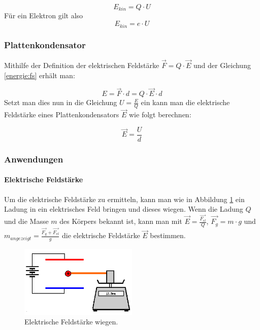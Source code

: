 \documentclass[a4paper]{article}
\begin{document}
				\begin{equation}
					E_{kin} = Q\cdot U
				\end{equation}
				Für ein Elektron gilt also
				\begin{equation}\label{elektrisches_feld:beschleunigung_elektron}
					E_{kin} = e\cdot U
				\end{equation}
			
			
			\subsubsection{Plattenkondensator}
				Mithilfe der Definition der elektrischen Feldstärke $\vec{F}=Q\cdot\vec{E}$ und der Gleichung \ref{energie:fs} erhält man:
			
				\begin{equation}
					E=\vec{F}\cdot d = Q\cdot\vec{E}\cdot d
				\end{equation}
				Setzt man dies nun in die Gleichung $U=\frac{E}{Q}$ ein kann man die elektrische Feldstärke eines Plattenkondensators $\vec{E}$ wie folgt berechnen:
				
				\begin{equation}\label{plattenkondensator:e}
					\vec{E}=\frac{U}{d}
				\end{equation}
	
			\subsubsection{Anwendungen}
		
				\paragraph{Elektrische Feldstärke}
					Um die elektrische Feldstärke zu ermitteln, kann man wie in Abbildung \ref{img:efeldwaag_ladungenober_ver} ein Ladung in ein elektrisches Feld bringen und dieses wiegen. Wenn die Ladung $Q$ und die Masse $m$ des Körpers bekannt ist, kann man mit $\vec{E}=\frac{\vec{F_{el}}}{Q}$, $\vec{F_g}=m\cdot g$ und $m_{angezeigt}=\frac{\vec{F_g} + \vec{F_{el}}}{g}$ die elektrische Feldstärke $\vec{E}$ bestimmen.
					\begin{figure}[H]
						\centering
						\includegraphics[width=0.5\textwidth]{img/efeldwaag_ladungenober_ver.png}
						\caption{Elektrische Feldstärke wiegen.}
						\label{img:efeldwaag_ladungenober_ver}
					\end{figure}
				
\end{document}
